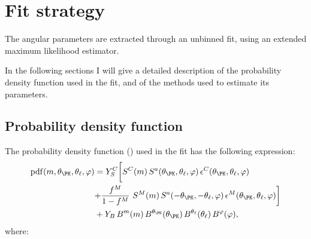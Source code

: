 \section{Fit strategy} \label{sec:fit}

The angular parameters are extracted through an unbinned fit, using an extended maximum likelihood estimator.

In the following sections I will give a detailed description of the probability density function used in the fit, and of the methods used to estimate its parameters.

\subsection{Probability density function}
\label{sec:TotalPDF}

The probability density function (\pdf) used in the fit has the following expression:
\begin{equation} \label{eq:angALL}
  \begin{split}
    \mathrm{pdf}(m,\theta_\PK,\theta_\ell,\varphi) & = Y^{C}_{S} \biggl[ S^{C}(m)  \, S^a(\theta_\PK,\theta_\ell,\varphi) \, \epsilon^{C}(\theta_\PK,\theta_\ell,\varphi) \biggr. \\
      & \biggl. + \frac{f^{M}}{1-f^{M}}~S^{M}(m) \, S^a(-\theta_\PK,-\theta_\ell,\varphi) \, \epsilon^{M}(\theta_\PK,\theta_\ell,\varphi) \biggr] \\
    & + Y_{B}\,B^m(m) \, B^{\theta_\PK}(\theta_\PK) \, B^{\theta_\ell}(\theta_\ell) \, B^{\varphi}(\varphi), \\
  \end{split}
\end{equation}
where:
